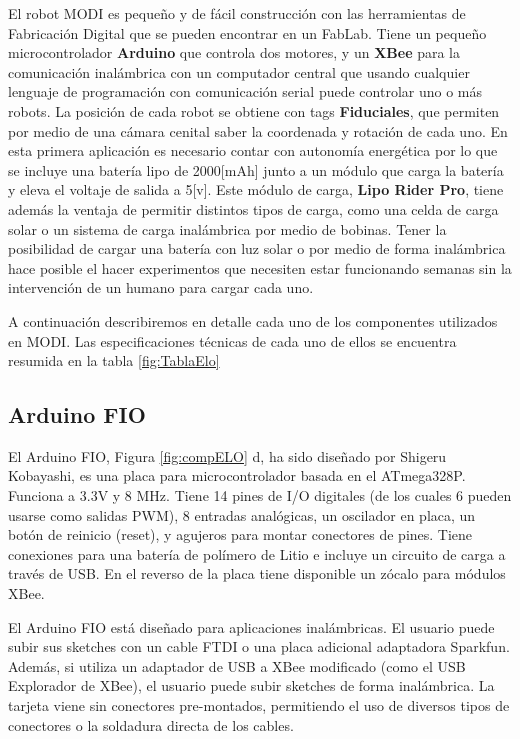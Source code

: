 El robot MODI es pequeño y de fácil construcción con las herramientas de Fabricación Digital que se pueden encontrar en un FabLab. Tiene un pequeño microcontrolador \textbf{Arduino} que controla dos motores, y un \textbf{XBee} para la comunicación inalámbrica con un computador central que usando cualquier lenguaje de programación con comunicación serial puede controlar uno o más robots. La posición de cada robot se obtiene con tags \textbf{Fiduciales}, que permiten por medio de una cámara cenital saber la coordenada y rotación de cada uno. En esta primera aplicación es necesario contar con autonomía energética por lo que se incluye una batería lipo de 2000[mAh] junto a un módulo que carga la batería y eleva el voltaje de salida a 5[v]. Este módulo de carga, \textbf{Lipo Rider Pro}, tiene además la ventaja de permitir distintos tipos de carga, como una celda de carga solar o un sistema de carga inalámbrica por medio de bobinas. Tener la posibilidad de cargar una batería con luz solar o por medio de forma inalámbrica hace posible el hacer experimentos que necesiten estar funcionando semanas sin la intervención de un humano para cargar cada uno.

A continuación describiremos en detalle cada uno de los componentes utilizados en MODI. Las especificaciones técnicas de cada uno de ellos se encuentra resumida en la tabla \ref{fig:TablaElo}

\subsection{Arduino FIO}
El Arduino FIO, Figura \ref{fig:compELO} d, ha sido diseñado por Shigeru Kobayashi, es una placa para microcontrolador basada en el ATmega328P. Funciona a 3.3V y 8 MHz. Tiene 14 pines de I/O digitales (de los cuales 6 pueden usarse como salidas PWM), 8 entradas analógicas, un oscilador en placa, un botón de reinicio (reset), y agujeros para montar conectores de pines. Tiene conexiones para una batería de polímero de Litio e incluye un circuito de carga a través de USB. En el reverso de la placa tiene disponible un zócalo para módulos XBee.

El Arduino FIO está diseñado para aplicaciones inalámbricas. El usuario puede subir sus sketches con un cable FTDI o una placa adicional adaptadora Sparkfun. Además, si utiliza un adaptador de USB a XBee modificado (como el USB Explorador de XBee), el usuario puede subir sketches de forma inalámbrica. La tarjeta viene sin conectores pre-montados, permitiendo el uso de diversos tipos de conectores o la soldadura directa de los cables. 

